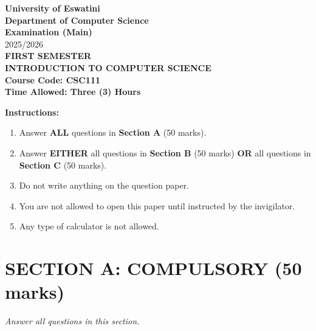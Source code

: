 \documentclass[12pt]{article}
\begin{document}
\begin{center}
    \textbf{University of Eswatini} \\
    \textbf{Department of Computer Science} \\
    \textbf{Examination (Main)} \\
    2025/2026 \\
    \textbf{FIRST SEMESTER} \\
    \vspace{1cm}
    \textbf{INTRODUCTION TO COMPUTER SCIENCE} \\
    \textbf{Course Code: CSC111} \\
    \vspace{1cm}
    \textbf{Time Allowed: Three (3) Hours}
\end{center}

\noindent
\textbf{Instructions:}
\begin{enumerate}
    \item Answer \textbf{ALL} questions in \textbf{Section A} (50 marks).
    \item Answer \textbf{EITHER} all questions in \textbf{Section B} (50 marks) \textbf{OR} all questions in \textbf{Section C} (50 marks).
    \item Do not write anything on the question paper.
    \item You are not allowed to open this paper until instructed by the invigilator.
    \item Any type of calculator is not allowed.
\end{enumerate}

\vspace{1cm}
\newpage
\section*{SECTION A: COMPULSORY (50 marks)}
\textit{Answer all questions in this section.}
\end{document}
